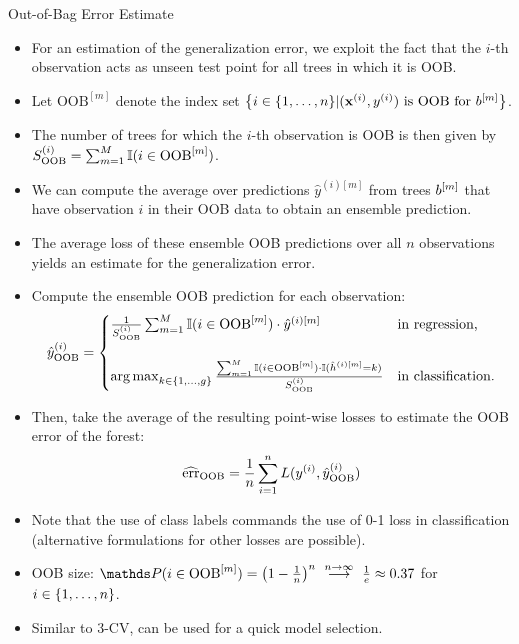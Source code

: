 \documentclass[11pt,compress,t,notes=noshow, xcolor=table]{beamer}
\begin{document}
\begin{vbframe}{Out-of-Bag Error Estimate}
\begin{itemize}
  \item For an estimation of the generalization error, we exploit the 
  fact that the $i$-th observation acts as unseen test point for all trees in 
  which it is OOB. 
  \item Let $\text{OOB}^{[m]}$ denote the index set 
  $\left \{i \in \{1, \ldots, n\} | (\mathbf{x}^{(i)}, y^{(i)}) \text{ is OOB for } b^{[m]} \right \}$.
  \item The number of trees for which the $i$-th observation is OOB is then 
  given by $S_{\text{OOB}}^{(i)} = 
  \sum_{m = 1}^M \mathbb{I}(i \in \text{OOB}^{[m]})$.
  \item We can compute the average over predictions $\hat{y}^{(i)[m]}$ from 
  trees $b^{[m]}$ that have observation $i$ in their OOB data to obtain an 
  ensemble prediction.
  \item The average loss of these ensemble OOB predictions over all $n$ 
  observations yields an estimate for the generalization error.
  \item Compute the ensemble OOB prediction for each observation:
  $$\hat{y}^{(i)}_{\text{OOB}} = \begin{cases}
  \frac{1}{S_{\text{OOB}}^{(i)}} \sum_{m = 1}^{M} 
  \mathbb{I}(i \in \text{OOB}^{[m]}) \cdot \hat{y}^{(i)[m]} & \text{in regression,} 
  \\ \phantom{x} \\
  \operatorname*{arg\,max}_{k \in \{1, \ldots, g\}} 
  \frac{\sum_{m = 1}^{M} \mathbb{I}(i \in \text{OOB}^{[m]}) \cdot 
  \mathbb{I}(\hat{h}^{(i)[m]} = k)} {S_{\text{OOB}}^{(i)}} &
  \text{in classification.}
  \end{cases}$$
  \item Then, take the average of the resulting point-wise losses to estimate 
  the OOB error of the forest:
  $$\widehat{\text{err}}_{\text{OOB}} = \frac{1}{n} \sum\limits_{i=1}^n L(y^{(i)}, \hat{y}^{(i)}_{\text{OOB}})$$
  \item Note that the use of class labels commands the use of 0-1 loss in 
  classification (alternative formulations for other losses are possible).
  \item OOB size: $\P(i \in \text{OOB}^{[m]}) = \left(1 - \frac{1}{n}\right)^n 
  \ \stackrel{n \to \infty}{\longrightarrow} \ \frac{1}{e} \approx 0.37$ for 
  $i \in \{1, \ldots, n\}$.
  \item Similar to 3-CV, can be used for a quick model selection.
\end{itemize}


\end{vbframe}

\endlecture
\end{document}
